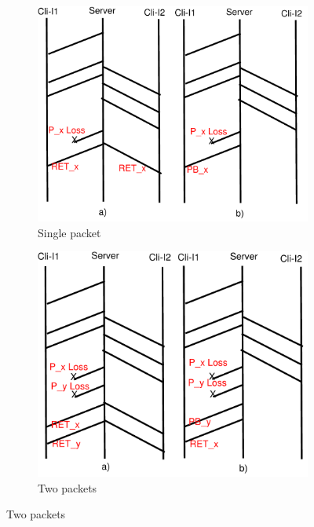 \documentclass[10pt,conference,compsoc]{IEEEtran}
\begin{document}
\begin{figure}[!tbp]
 \begin{subfigure}[b]{0.32\textwidth}
	\includegraphics[angle=0, width=\textwidth, natwidth=610, natheight=400]{images/timing1P.pdf}
	\caption{Single packet}\label{timing1P}
 \end{subfigure}
 \hfill
 \begin{subfigure}[b]{0.32\textwidth} 
	\includegraphics[angle=0, width=\textwidth, natwidth=610, natheight=400]{images/timing2P.pdf}
	\caption{Two packets }\label{timing2P}
 \end{subfigure} 

\end{figure}
\end{document}
